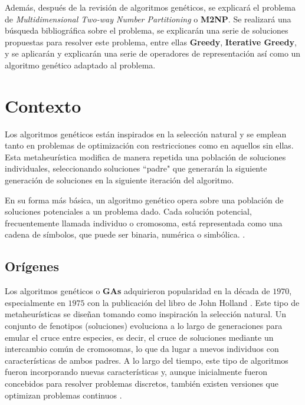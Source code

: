 \documentclass[12pt,letterpaper]{article}
\begin{document}
Además, después de la revisión de algoritmos genéticos, se explicará el problema de \textit{Multidimensional Two-way Number Partitioning} o \textbf{M2NP}. Se realizará una búsqueda bibliográfica sobre el problema, se explicarán una serie de soluciones propuestas para resolver este problema, entre ellas \textbf{Greedy}, \textbf{Iterative Greedy}, y se aplicarán y explicarán una serie de operadores de representación así como un algoritmo genético adaptado al problema.

\section{Contexto}
Los algoritmos genéticos están inspirados en la selección natural y se emplean tanto en problemas de optimización con restricciones como en aquellos sin ellas. Esta metaheurística modifica de manera repetida una población de soluciones individuales, seleccionando soluciones ``padre" que generarán la siguiente generación de soluciones en la siguiente iteración del algoritmo.

En su forma más básica, un algoritmo genético opera sobre una población de soluciones potenciales a un problema dado. Cada solución potencial, frecuentemente llamada individuo o cromosoma, está representada como una cadena de símbolos, que puede ser binaria, numérica o simbólica. \cite{10.5555/522098}.

\subsection{Orígenes}
Los algoritmos genéticos o \textbf{GAs} adquirieron popularidad en la década de $1970$, especialmente en $1975$ con la publicación del libro de John Holland \cite{Holland:1975}. Este tipo de metaheurísticas se diseñan tomando como inspiración la selección natural. Un conjunto de fenotipos (soluciones) evoluciona a lo largo de generaciones para emular el cruce entre especies, es decir, el cruce de soluciones mediante un intercambio común de cromosomas, lo que da lugar a nuevos individuos con características de ambos padres. A lo largo del tiempo, este tipo de algoritmos fueron incorporando nuevas características y, aunque inicialmente fueron concebidos para resolver problemas discretos, también existen versiones que optimizan problemas continuos \cite{eiben2015}.
\end{document}
